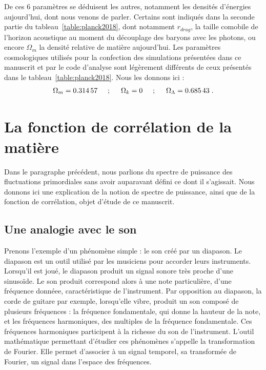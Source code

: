 \documentclass[11pt, twoside, a4paper, openright]{report}
\begin{document}
De ces 6 paramètres se déduisent les autres, notamment les densités d'énergies aujourd'hui, dont nous venons de parler. Certains sont indiqués dans la seconde partie du tableau~\ref{table:planck2018},
dont notamment $r_{drag}$, la taille comobile de l'horizon acoustique au moment du découplage des baryons avec les photons,
ou encore $\Omega_m$ la densité relative de matière aujourd'hui. Les paramètres cosmologiques utilisés pour la confection des simulations présentées dans ce manuscrit et par le code d'analyse \picca{} sont légèrement différents de ceux présentés dans le tableau~\ref{table:planck2018}. Nous les donnons ici :
\begin{equation}
  \label{eq:par_cosmo}
  \Omega_m = \num{0.31457} \hspace{0.5cm} ; \hspace{0.5cm} \Omega_k = \num{0} \hspace{0.5cm} ; \hspace{0.5cm} \Omega_{\Lambda} = \num{0.68543}  \; .
\end{equation}



\section{La fonction de corrélation de la matière}

Dans le paragraphe précédent, nous parlions du spectre de puissance des fluctuations primordiales sans avoir auparavant défini ce dont il s'agissait. Nous donnons ici une explication de la notion de spectre de puissance, ainsi que de la fonction de corrélation, objet d'étude de ce manuscrit.

\subsection{Une analogie avec le son}

Prenons l'exemple d'un phénomène simple : le son créé par un diapason. Le diapason est un outil utilisé par les musiciens pour accorder leurs instruments. Lorsqu'il est joué, le diapason produit un signal sonore très proche d'une sinusoïde.
Le son produit correspond alors à une note particulière, d'une fréquence donnéee, caractéristique de l'instrument. Par opposition au diapason, la corde de guitare par exemple, lorsqu'elle vibre, produit un son composé de plusieurs fréquences : la fréquence fondamentale, qui donne la hauteur de la note, et les fréquences harmoniques, des multiples de la fréquence fondamentale. Ces fréquences harmoniques participent à la richesse du son de l'instrument. L'outil mathématique permettant d'étudier ces phénomènes s'appelle la transformation de Fourier. Elle permet d'associer à un signal temporel, sa transformée de Fourier, un signal dans l'espace des fréquences.
\end{document}
